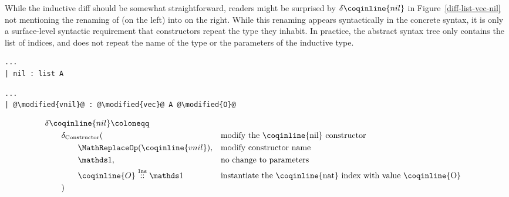 While the inductive diff should be somewhat straightforward, readers might be
surprised by $\delta\coqinline{nil}$ in Figure~\ref{diff-list-vec-nil} not
mentioning the renaming of  (on the left) into 
on the right.  While this renaming appears syntactically in the concrete syntax,
it is only a surface-level syntactic requirement that constructors repeat the
type they inhabit.  In practice, the abstract syntax tree only contains the list
of indices, and does not repeat the name of the type or the parameters of the
inductive type.

\begin{figure*}[!htp]

  \noindent%
  \begin{minipage}[t]{0.50\textwidth}
    \begin{verbatim}
...
| nil : list A
  \end{verbatim}
\end{minipage}%
\begin{minipage}[t]{0.50\textwidth}
  \begin{verbatim}
...
| @\modified{vnil}@ : @\modified{vec}@ A @\modified{O}@
  \end{verbatim}
\end{minipage}

  \vspace{2em}%

  \begin{align*}
& \delta\coqinline{nil} \coloneqq & && \\
& \qquad \delta_{\ConstructorText} ( && \text{modify the \coqinline{nil} constructor} \\
& \qquad \qquad \MathReplace{\coqinline{vnil}}, && \text{modify constructor name} \\
& \qquad \qquad \MathSame{},                    && \text{no change to parameters} \\
& \qquad \qquad \MathIns{\coqinline{O}}{\MathSame{}}
  && \text{instantiate the \coqinline{nat} index with value \coqinline{O}} \\
& \qquad ) && \\
  \end{align*}

  \caption{Diff for our running example ( constructor only)}
  \label{diff-list-vec-nil}

\end{figure*}

